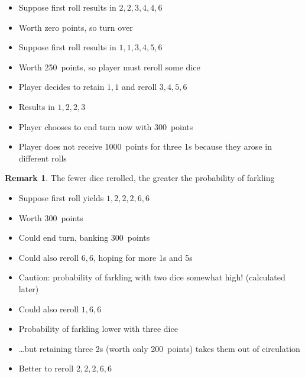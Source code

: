\documentclass[handout]{beamer}
\theoremstyle{definition}
\newtheorem{remark}{Remark}
\begin{document}
\begin{frame}
\begin{example}
\begin{itemize}
\item Suppose first roll results in $2,2,3,4,4,6$
\item Worth zero points, so turn over
\end{itemize}
\end{example}
\begin{example}
\begin{itemize}
\item Suppose first roll results in $1,1,3,4,5,6$
\item Worth 250~points, so player must reroll \alert{some}
dice
\item Player decides to retain $1,1$ and reroll $3,4,5,6$
\item Results in $1,2,2,3$
\item Player chooses to end turn now with 300~points
\item Player does \alert{not} receive 1000~points for three 1s
because they arose in different rolls
\end{itemize}
\end{example}
\begin{remark}
The fewer dice rerolled, the greater
the probability of farkling
\end{remark}
\end{frame}

\begin{frame}
\begin{example}
\begin{itemize}
\item Suppose first roll yields $1,2,2,2,6,6$
\item Worth 300~points
\item Could end turn, banking 300~points
\item Could also reroll $6,6$, hoping for more 1s and 5s
\item \alert{Caution:}
probability of farkling with two dice somewhat high!
(calculated later)
\item Could also reroll $1,6,6$
\item Probability of farkling lower with three dice
\item \dots but retaining three 2s 
(worth only 200~points)
takes them out of circulation
\item Better to reroll $2,2,2,6,6$
\end{itemize}
\end{example}
\end{frame}
\end{document}
